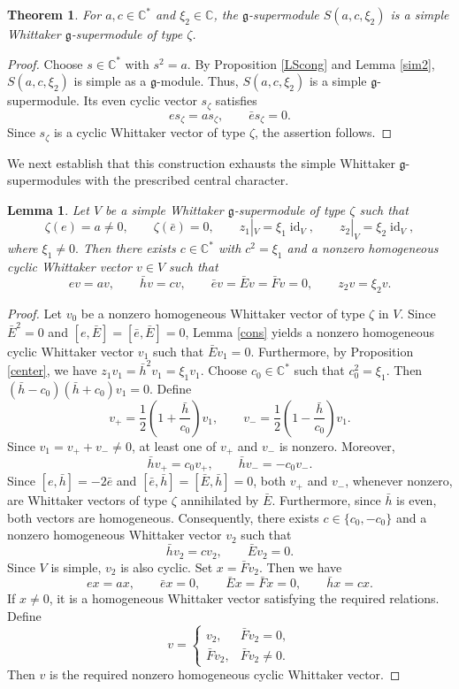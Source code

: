 \documentclass[a4paper,10pt]{article}
\theoremstyle{definition}
\theoremstyle{plain}
\newtheorem{theorem}[definition]{Theorem}
\newtheorem{lemma}[definition]{Lemma}
\theoremstyle{remark}
\theoremstyle{mystyle}
\numberwithin{equation}{section}
\begin{document}
\begin{theorem}\label{Ssim}
    For $a,c\in \mathbb C^*$ and $\xi_2\in\mathbb C$, the $\mathfrak g$-supermodule $S(a,c,\xi_2)$ is a simple Whittaker $\mathfrak g$-supermodule of type $\zeta$.
\end{theorem}
\begin{proof}
    Choose \(s\in\mathbb C^*\) with \(s^2=a\). By Proposition \ref{LScong} and Lemma \ref{sim2}, \( S(a,c,\xi_2)\) is simple as a $\mathfrak g$-module. Thus, $S(a,c,\xi_2)$ is a simple $\mathfrak g$-supermodule. Its even cyclic vector \(s_{\zeta}\) satisfies
    \[
    es_{\zeta}=as_{\zeta},\qquad
    \bar es_{\zeta}=0.
    \]
    Since \(s_{\zeta}\) is a cyclic Whittaker vector of type \(\zeta\), the assertion follows.
\end{proof}

We next establish that this construction exhausts the simple Whittaker $\mathfrak g$-supermodules with the prescribed central character.
\begin{lemma}\label{Vstru}
    Let \(V\) be a simple Whittaker $\mathfrak g$-supermodule of type $\zeta$ such that
    \[
    \zeta(e)=a\neq0,\qquad\zeta(\bar e)=0,\qquad z_1|_V=\xi_1\operatorname{id}_V, \qquad z_2|_V=\xi_2\operatorname{id}_V,\]
    where $\xi_1\neq0.$ Then there exists \(c\in\mathbb C^*\) with $c^2=\xi_1$ and a nonzero homogeneous cyclic Whittaker vector \(v\in V\) such that 
    \[
    ev=av,\qquad \bar hv=cv,\qquad \bar ev=\bar Ev=\bar Fv=0,\qquad z_2v=\xi_2v.
    \]
\end{lemma}
\begin{proof}
    Let \(v_0\) be a nonzero homogeneous Whittaker vector of type \(\zeta\) in \(V\). Since $\bar E^2=0$ and $[e,\bar E]=[\bar e,\bar E]=0$, Lemma \ref{cons} yields a nonzero homogeneous cyclic Whittaker vector \(v_1\) such that $\bar Ev_1=0$. Furthermore, by Proposition \ref{center}, we have $ z_1v_1=\bar h^2v_1=\xi_1v_1$. Choose $c_0\in \mathbb C^*$ such that $c_0^2=\xi_1.$ Then $(\bar h-c_0)(\bar h+c_0)v_1=0$. 
    Define
    \[
    v_+=\frac12\left(1+\frac{\bar h}{c_0}\right)v_1,\qquad v_-=\frac12\left(1-\frac{\bar h}{c_0}\right)v_1.
    \]
    Since $v_1=v_++v_-\neq 0$, at least one of \(v_+\) and \(v_-\) is nonzero. Moreover, 
    \[
    \bar hv_+=c_0v_+,\qquad \bar hv_-=-c_0v_-.
    \]
    Since $[e,\bar h]=-2\bar e$ and $[\bar e,\bar h]=[\bar E,\bar h]=0$, both $v_+$ and $v_-$, whenever nonzero, are Whittaker vectors of type $\zeta$ annihilated by \(\bar E\). Furthermore, since \(\bar h\) is even, both vectors are homogeneous. Consequently, there exists $c\in\{c_0,-c_0\}$ and a nonzero homogeneous Whittaker vector \(v_2\) such that
    \[
    \bar hv_2=cv_2,\qquad\bar Ev_2=0.
    \]
    Since $V$ is simple, \(v_2\) is also cyclic. Set $x=\bar Fv_2$. Then we have
    \[
    ex=ax,\qquad \bar ex=0,\qquad \bar Ex=\bar Fx=0,\qquad \bar hx=cx.
    \]
    If $x\neq 0$, it is a homogeneous Whittaker vector satisfying the required relations. Define
    \[
    v=
    \begin{cases}
        v_2,&\bar Fv_2=0,\\
        \bar Fv_2,&\bar Fv_2\neq0.
    \end{cases}
    \]
    Then $v$ is the required nonzero homogeneous cyclic Whittaker vector.
\end{proof}
\end{document}
